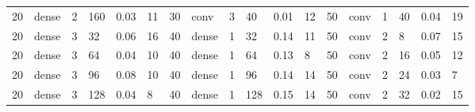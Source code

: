 \begin{table}
{\begin{tabular}{@{}llllll|llllll|llllll@{}}
20                              & dense                          & 2                              & 160                            & 0.03                             & 11                                & 30                              & conv                           & 3                              & 40                             & 0.01                           & 12                                & 50                              & conv                           & 1                              & 40                             & 0.04                           & 19                               \\
20                              & dense                          & 3                              & 32                             & 0.06                             & 16                                & 40                              & dense                          & 1                              & 32                             & 0.14                           & 11                                & 50                              & conv                           & 2                              & 8                              & 0.07                           & 15                               \\
20                              & dense                          & 3                              & 64                             & 0.04                             & 10                                & 40                              & dense                          & 1                              & 64                             & 0.13                           & 8                                 & 50                              & conv                           & 2                              & 16                             & 0.05                           & 12                               \\
20                              & dense                          & 3                              & 96                             & 0.08                             & 10                                & 40                              & dense                          & 1                              & 96                             & 0.14                           & 14                                & 50                              & conv                           & 2                              & 24                             & 0.03                           & 7                                \\
20                              & dense                          & 3                              & 128                            & 0.04                             & 8                                 & 40                              & dense                          & 1                              & 128                            & 0.15                           & 14                                & 50                              & conv                           & 2                              & 32                             & 0.02                           & 15                               \\

\end{tabular}}
\end{table}
